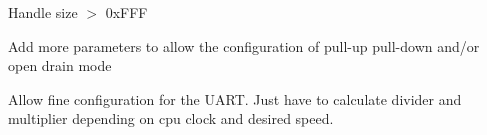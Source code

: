 
\begin{DoxyRefList}
\item[\label{todo__todo000001}%
\hypertarget{todo__todo000001}{}%
Global \hyperlink{group__dma_gad72ed242e36f2827ea3a6f22b92a05f9}{rflpc\-\_\-dma\-\_\-start} (rflpc\-\_\-dma\-\_\-channel\-\_\-t channel, void $\ast$dest, const void $\ast$src, uint32\-\_\-t size)]Handle size $>$ 0x\-F\-F\-F  
\item[\label{todo__todo000002}%
\hypertarget{todo__todo000002}{}%
Global \hyperlink{group__gpio_gae710c04d73fd0ccacc27175133f45bd1}{rflpc\-\_\-gpio\-\_\-use\-\_\-pin} (int gpio, int pin)]Add more parameters to allow the configuration of pull-\/up pull-\/down and/or open drain mode  
\item[\label{todo__todo000003}%
\hypertarget{todo__todo000003}{}%
Group \hyperlink{group__uart}{uart} ]Allow fine configuration for the U\-A\-R\-T. Just have to calculate divider and multiplier depending on cpu clock and desired speed.


\end{DoxyRefList}